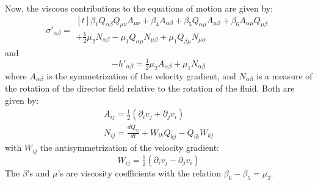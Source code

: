 \documentclass[reqno]{article}
\begin{document}
  Now, the viscous contributions to the equations of motion are given by:
  \begin{equation}
    \sigma'_{\alpha \beta}
    =
    \begin{multlined}[t]
      \beta_1 Q_{\alpha \beta} Q_{\mu \nu} A_{\mu \nu}
      + \beta_4 A_{\alpha \beta}
      + \beta_5 Q_{\alpha \mu} A_{\mu \beta}
      + \beta_6 A_{\alpha \mu} Q_{\mu \beta} \\
      + \tfrac12 \mu_2 N_{\alpha \beta}
      - \mu_1 Q_{\alpha \mu} N_{\mu \beta}
      + \mu_1 Q_{\beta \mu} N_{\mu \alpha}
    \end{multlined}
  \end{equation}
  and
  \begin{equation}
    - h'_{\alpha \beta}
    = \tfrac12 \mu_2 A_{\alpha \beta}
    + \mu_1 N_{\alpha \beta}
  \end{equation}
  where $A_{\alpha \beta}$ is the symmetrization of the velocity gradient, and
  $N_{\alpha \beta}$ is a measure of the rotation of the director field relative
  to the rotation of the fluid.
  Both are given by:
  \begin{align}
    A_{ij}
    = \tfrac12 \left( \partial_i v_j + \partial_j v_i \right) \\
    N_{ij}
    = \frac{d Q_{ij}}{dt}
    + W_{ik} Q_{kj}
    - Q_{ik} W_{kj}
  \end{align}
  with $W_{ij}$ the antisymmetrization of the velocity gradient:
  \begin{equation}
    W_{ij}
    = \tfrac12 \left( \partial_i v_j - \partial_j v_i \right)
  \end{equation}
  The $\beta$'s and $\mu$'s are viscosity coefficients with the relation
  $\beta_6 - \beta_5 = \mu_2$.
\end{document}
